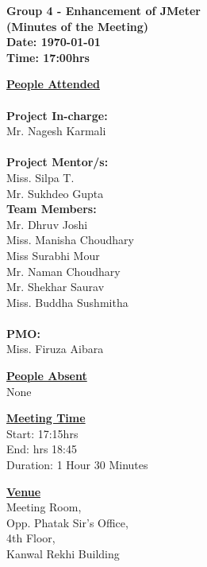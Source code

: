 \documentclass[a4paper,12pt]{article}
\begin{document}
\LARGE
\begin{center}
\textbf
{
Group 4 - Enhancement of JMeter\\
(Minutes of the Meeting) \\ 
Date: \today \\
Time: 17:00hrs
}
\end{center}

\vfill

\large

\underline{\textbf{People Attended}} \\ 
\\
\indent \textbf{Project In-charge:} \\
\indent Mr. Nagesh Karmali \\
\\
\indent \textbf{Project Mentor/s:} \\
\indent Miss. Silpa T. \\
\indent Mr. Sukhdeo Gupta \\
\vfill
\indent \textbf{Team Members:} \\
\indent Mr. Dhruv Joshi \\
\indent Miss. Manisha Choudhary \\
\indent Miss Surabhi Mour \\
\indent Mr. Naman Choudhary \\
\indent Mr. Shekhar Saurav \\
\indent Miss. Buddha Sushmitha \\
\\
\indent \textbf{PMO:} \\
\indent Miss. Firuza Aibara\\

\vfill

\underline{\textbf{People Absent}} \\ 
\indent None \\
\vfill

\underline{\textbf{Meeting Time}} \\
\indent Start: 17:15hrs \\
\indent End: hrs 18:45\\
\indent Duration: 1 Hour 30 Minutes \\

\vfill

\underline{\textbf{Venue}} \\
\indent Meeting Room, \\ 
\indent Opp. Phatak Sir's Office,\\ 
\indent 4th Floor, \\
\indent Kanwal Rekhi Building
\end{document}
